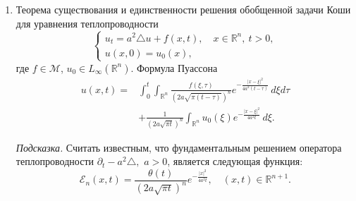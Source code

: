 \documentclass[unicode,12pt,draft]{article}
\begin{document}
\begin{enumerate}
\item
Теорема существования и единственности решения обобщенной задачи
Коши для уравнения теплопроводности
$$
    \left\{
        \begin{array}{l}
            u_t = a^2 \triangle u + f (x, t),
            \quad
            x \in {\mathbb R}^n,
            \:
            t > 0,
            \\
            u (x, 0) = u_0 (x),
        \end{array}
    \right.
$$
где $f \in {\mathcal M}$, $u_0 \in L_\infty ({\mathbb R}^n)$.
Формула Пуассона
\begin{align*}
    u (x, t)
    =
    {}
    &
    \int_0^t
    \int_{
        {\mathbb R}^n
    }
    \frac{
        f (\xi, \tau)
    }{
        (
            2
            a
            \sqrt {
                \pi
                (t - \tau)
            }
        )^n
    }
    e^{
        - \frac{
            |x - \xi|^2
        }{
            4
            a^2
            (t - \tau)
        }
    }
    \,
    d\xi
    d\tau
    \\
    &
    +
    \frac{
        1
    }{
        (
            2
            a
            \sqrt {
                \pi
                t
            }
        )^n
    }
    \int_{
        {\mathbb R}^n
    }
    u_0 (\xi)
    e^{
        - \frac{
            |x - \xi|^2
        }{
            4
            a^2
            t
        }
    }
    \,
    d\xi.
\end{align*}

{\it Подсказка.} Считать известным, что фундаментальным решением
оператора теплопроводности $
    \partial_t - a^2 \triangle,
$ $a > 0$, является следующая функция:
$$
    {\mathcal E}_n (x, t)
    =
    \frac{
        \theta (t)
    }{
        (
            2
            a
            \sqrt{
                \pi t
            }
        )^n
    }
    e^{
        - \frac{
            |x|^2
        }{
            4 a^2 t
        }
    },
    \quad
    (x, t) \in {\mathbb R}^{n+1}.
$$


\end{enumerate}
\end{document}
